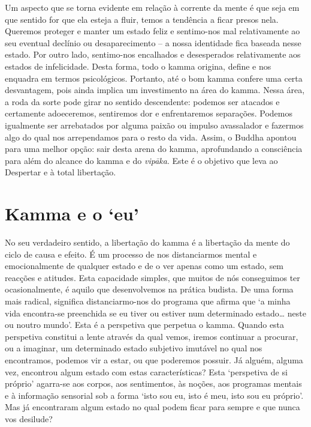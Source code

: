 Um aspecto que se torna evidente em relação à corrente da mente é que seja em
que sentido for que ela esteja a fluir, temos a tendência a ficar presos nela.
Queremos proteger e manter um estado feliz e sentimo-nos mal relativamente ao
seu eventual declínio ou desaparecimento -- a nossa identidade fica baseada
nesse estado. Por outro lado, sentimo-nos encalhados e desesperados
relativamente aos estados de infelicidade. Desta forma, todo o kamma origina,
define e nos enquadra em termos psicológicos. Portanto, até o bom kamma confere
uma certa desvantagem, pois ainda implica um investimento na área do kamma.
Nessa área, a roda da sorte pode girar no sentido descendente: podemos ser
atacados e certamente adoeceremos, sentiremos dor e enfrentaremos separações.
Podemos igualmente ser arrebatados por alguma paixão ou impulso avassalador e
fazermos algo do qual nos arrependamos para o resto da vida. Assim, o Buddha
apontou para uma melhor opção: sair desta arena do kamma, aprofundando a
consciência para além do alcance do kamma e do \emph{vipāka}. Este é o objetivo
que leva ao Despertar e à total libertação.

\section{Kamma e o `eu\kern -0.5pt'}

No seu verdadeiro sentido, a libertação do kamma é a libertação da mente do
ciclo de causa e efeito. É um processo de nos distanciarmos mental e
emocionalmente de qualquer estado e de o ver apenas como um estado, sem reacções
e atitudes. Esta capacidade simples, que muitos de nós conseguimos ter
ocasionalmente, é aquilo que desenvolvemos na prática budista. De uma forma mais
radical, significa distanciarmo-nos do programa que afirma que `a minha vida
encontra-se preenchida se eu tiver ou estiver num determinado estado\ldots{}
neste ou noutro mundo'. Esta é a perspetiva que perpetua o kamma. Quando esta
perspetiva constitui a lente através da qual vemos, iremos continuar a procurar,
ou a imaginar, um determinado estado subjetivo imutável no qual nos encontramos,
podemos vir a estar, ou que poderemos possuir. Já alguém, alguma vez, encontrou
algum estado com estas características? Esta `perspetiva de si próprio'
agarra-se aos corpos, aos sentimentos, às noções, aos programas mentais e à
informação sensorial sob a forma `isto sou eu, isto é meu, isto sou eu próprio'.
Mas já encontraram algum estado no qual podem ficar para sempre e que nunca vos
desilude?

